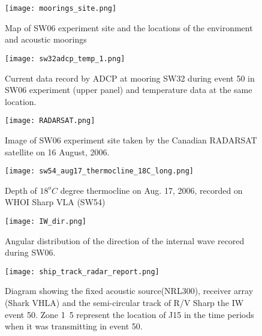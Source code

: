 
\begin{figure}
\centering
\texttt{[image: moorings\_site.png]}
\caption{Map of SW06 experiment site and the locations of the environment and acoustic moorings}\label{fig:mooring}
\end{figure}

\begin{figure}[h]
\centering
  \texttt{[image: sw32adcp\_temp\_1.png]}\\
  \caption{Current data record by ADCP at mooring SW32 during event 50 in SW06 experiment (upper panel) and  temperature data at the same location. }
  \label{fig: sw32adcp_temp}
\end{figure}

\begin{figure}[h]
\centering
  \texttt{[image: RADARSAT.png]}\\
  \caption{Image of SW06 experiment site taken by the Canadian RADARSAT satellite on 16 August, 2006.  }
  \label{fig:radarsat}
\end{figure}
%

\begin{figure}[h]
\centering
  \texttt{[image: sw54\_aug17\_thermocline\_18C\_long.png]}\\
  \caption{Depth of  $18^oC$ degree thermocline on Aug. 17, 2006, recorded on WHOI Sharp VLA (SW54)}
  \label{fig:sw54_aug17_thermocline_18C_long}
\end{figure}

\begin{figure}[h]
\centering
  \texttt{[image: IW\_dir.png]}\\
  \caption{Angular distribution of the direction of the internal wave recored during SW06. }
  \label{fig:IW_dir}
\end{figure}


\begin{figure}[h]
\centering
  \texttt{[image: ship\_track\_radar\_report.png]}\\
  \caption{Diagram showing the fixed acoustic source(NRL300), receiver array (Shark VHLA) and the semi-circular track of R/V Sharp the IW event 50. Zone 1~5 represent the location of J15 in the time periods when it was transmitting in event 50.}
  \label{fig:ship_track_radar}
\end{figure}

